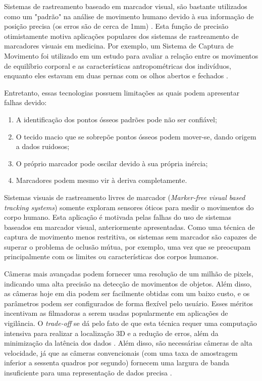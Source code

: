Sistemas de rastreamento baseado em marcador visual, são bastante utilizados como um "padrão" na análise de movimento humano devido à sua informação de posição precisa (os erros são de cerca de 1mm) \cite{zhang2002visual}. Esta função de precisão otimistamente motiva aplicações populares dos sistemas de rastreamento de marcadores visuais em medicina. Por exemplo, um Sistema de Captura de Movimento foi utilizado em um estudo para avaliar a relação entre os movimentos de equilíbrio corporal e as características antropométricas dos indivíduos, enquanto eles estavam em duas pernas com os olhos abertos e fechados \cite{kejonen2003}.

Entretanto, essas tecnologias possuem limitações as quais podem apresentar falhas devido:

\begin{enumerate}
    \item A identificação dos pontos ósseos padrões pode não ser confiável; 
    \item O tecido macio que se sobrepõe pontos ósseos podem mover-se, dando origem a dados ruidosos; 
    \item O próprio marcador pode oscilar devido à sua própria inércia; 
    \item Marcadores podem mesmo vir à deriva completamente.
\end{enumerate}

Sistemas visuais de rastreamento livres de marcador (\textit{Marker-free visual based tracking systems}) somente exploram sensores óticos para medir o movimentos do corpo humano. Esta aplicação é motivada pelas falhas do uso de sistemas baseados em marcador visual, anteriormente apresentadas. Como uma técnica de captura de movimento menos restritiva, os sistemas sem marcador são capazes de superar o problema de oclusão mútua, por exemplo, uma vez que se preocupam principalmente com os limites ou características dos corpos humanos\cite{zhou2008human}.

Câmeras mais avançadas podem fornecer uma resolução de um milhão de pixels, indicando uma alta precisão na detecção de movimentos de objetos. Além disso, as câmeras hoje em dia podem ser facilmente obtidas com um baixo custo, e os parâmetros podem ser configurados de forma flexível pelo usuário. Esses méritos incentivam as filmadoras a serem usadas popularmente em aplicações de vigilância. O \textit{trade-off} se dá pelo fato de que esta técnica requer uma computação intensiva para realizar a localização 3D e a redução de erros, além da minimização da latência dos dados \cite{bryson1993}. Além disso, são necessárias câmeras de alta velocidade, já que as câmeras convencionais (com uma taxa de amostragem inferior a sessenta quadros por segundo) fornecem uma largura de banda insuficiente para uma representação de dados precisa \cite{bhatnagar1993position}.


